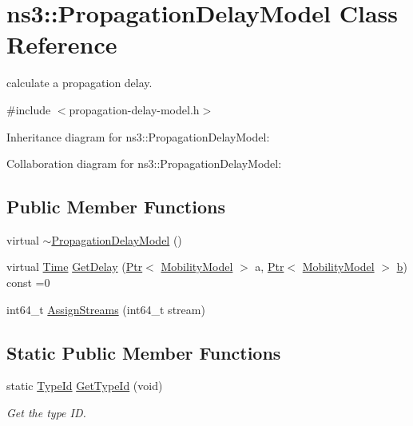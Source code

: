 \hypertarget{classns3_1_1PropagationDelayModel}{}\section{ns3\+:\+:Propagation\+Delay\+Model Class Reference}
\label{classns3_1_1PropagationDelayModel}


calculate a propagation delay.  




{\ttfamily \#include $<$propagation-\/delay-\/model.\+h$>$}



Inheritance diagram for ns3\+:\+:Propagation\+Delay\+Model\+:


Collaboration diagram for ns3\+:\+:Propagation\+Delay\+Model\+:
\subsection*{Public Member Functions}
\begin{DoxyCompactItemize}
\item 
virtual \hyperlink{classns3_1_1PropagationDelayModel_ad4da63fda022b9f1491007533694564b}{$\sim$\+Propagation\+Delay\+Model} ()
\item 
virtual \hyperlink{classns3_1_1Time}{Time} \hyperlink{classns3_1_1PropagationDelayModel_adeb74048540fd0b3d440090a46fb51b0}{Get\+Delay} (\hyperlink{classns3_1_1Ptr}{Ptr}$<$ \hyperlink{classns3_1_1MobilityModel}{Mobility\+Model} $>$ a, \hyperlink{classns3_1_1Ptr}{Ptr}$<$ \hyperlink{classns3_1_1MobilityModel}{Mobility\+Model} $>$ \hyperlink{lte__pathloss_8m_a21ad0bd836b90d08f4cf640b4c298e7c}{b}) const =0
\item 
int64\+\_\+t \hyperlink{classns3_1_1PropagationDelayModel_aad7f56f8231d69db5d1378e0765fe4b5}{Assign\+Streams} (int64\+\_\+t stream)
\end{DoxyCompactItemize}
\subsection*{Static Public Member Functions}
\begin{DoxyCompactItemize}
\item 
static \hyperlink{classns3_1_1TypeId}{Type\+Id} \hyperlink{classns3_1_1PropagationDelayModel_ac5a3233842e5d2683dcb3eacfd187053}{Get\+Type\+Id} (void)
\begin{DoxyCompactList}\small\item\em Get the type ID. \end{DoxyCompactList}\end{DoxyCompactItemize}
